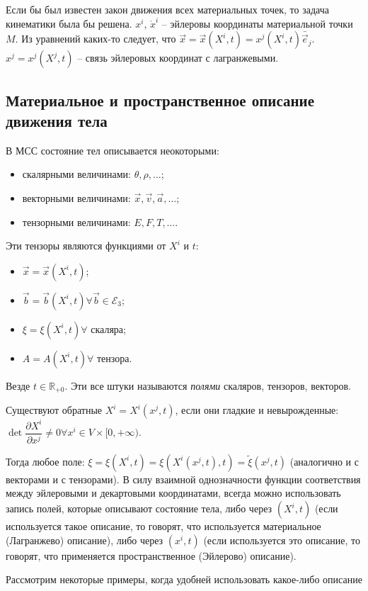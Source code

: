 Если бы был известен закон движения всех материальных точек, то задача кинематики была бы решена.
$x^{i}$, $\mathring{x}^i$ -- эйлеровы координаты материальной точки $M$. Из уравнений каких-то
следует, что $\vec{x} = \vec{x} (X^i, t) = x^j ( X^i, t) \bar{\vec{e}}_j$. $x^j = x^j(X^j, t)$
-- связь эйлеровых координат с лагранжевыми.

\subsection{Материальное и пространственное описание движения тела}

В МСС состояние тел описывается неокоторыми:
\begin{itemize}
  \item скалярными величинами: $\theta, \rho, \dots$;
  \item векторными величинами: $\vec{x}, \vec{v}, \vec{a}, \dots$;
  \item тензорными величинами: $E, F, T, \dots$.
\end{itemize}

Эти тензоры являются функциями от $X^i$ и $t$:
\begin{itemize}
  \item $\vec{x} = \vec{x} (X^i, t)$;
  \item $\vec{b} = \vec{b} (X^i, t) \forall \vec{b} \in \mathcal{E}_3$;
  \item $\xi = \xi(X^i, t) \forall $ скаляра;
  \item $A = A(X^i, t) \forall$ тензора.
\end{itemize}
Везде $t \in \mathbb{R}_{+0}$. Эти все штуки называются \emph{полями} скаляров, тензоров, векторов.

Существуют обратные $X^i = X^i ( x^j, t )$, если они гладкие и невырожденные: $\det \dfrac{\partial X^i}{\partial x^j} \neq 0 \forall x^i \in V \times [0, +\infty)$.

Тогда любое поле: $\xi = \xi(X^i, t) = \xi(X^i(x^j, t), t) = \tilde{\xi} (x^j, t)$ (аналогично и с
векторами и с тензорами). В силу взаимной однозначности функции соответствия между эйлеровыми и 
декартовыми координатами, всегда можно использовать запись полей, которые описывают состояние
тела, либо через $(X^i, t)$ (если используется такое описание, то говорят, что используется
материальное (Лагранжево) описание), либо через $(x^i, t)$ (если используется это описание, то 
говорят, что применяется пространственное (Эйлерово) описание).

Рассмотрим некоторые примеры, когда удобней использовать какое-либо описание

